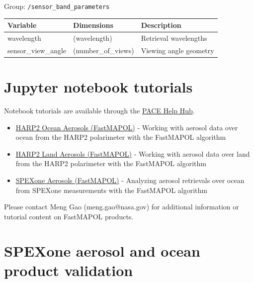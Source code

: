 \documentclass[
  11pt,
  letterpaper,
  DIV=11,
  numbers=noendperiod]{scrreprt}
\providecommand{\tightlist}{%
  \setlength{\itemsep}{0pt}\setlength{\parskip}{0pt}}
\begin{document}
Group: \texttt{/sensor\_band\_parameters}

\begin{longtable}[]{@{}lll@{}}
\toprule\noalign{}
Variable & Dimensions & Description \\
\midrule\noalign{}
\endhead
\bottomrule\noalign{}
\endlastfoot
wavelength & (wavelength) & Retrieval wavelengths \\
sensor\_view\_angle & (number\_of\_views) & Viewing angle geometry \\
\end{longtable}


\chapter{Jupyter notebook tutorials}\label{jupyter-notebook-tutorials}

Notebook tutorials are available through the
\href{https://nasa.github.io/oceandata-notebooks/sections/cloud-atmosphere.html}{PACE
Help Hub}.

\begin{itemize}
\tightlist
\item
  \href{https://nasa.github.io/oceandata-notebooks/notebooks/harp2/harp2_l2_fastmapol_aerosol_ocean_product.html}{HARP2
  Ocean Aerosols (FastMAPOL)} - Working with aerosol data over ocean
  from the HARP2 polarimeter with the FastMAPOL algorithm
\item
  \href{https://nasa.github.io/oceandata-notebooks/notebooks/harp2/harp2_l2_fastmapol_aerosol_land_product.html}{HARP2
  Land Aerosols (FastMAPOL)} - Working with aerosol data over land from
  the HARP2 polarimeter with the FastMAPOL algorithm
\item
  \href{https://nasa.github.io/oceandata-notebooks/notebooks/spexone/spexone_l2_fastmapol_aerosol_product.html}{SPEXone
  Aerosols (FastMAPOL)} - Analyzing aerosol retrievals over ocean from
  SPEXone measurements with the FastMAPOL algorithm
\end{itemize}

Please contact Meng Gao (meng.gao@nasa.gov) for additional information
or tutorial content on FastMAPOL products.


\chapter{SPEXone aerosol and ocean product
validation}\label{spexone-aerosol-and-ocean-product-validation}
\end{document}
